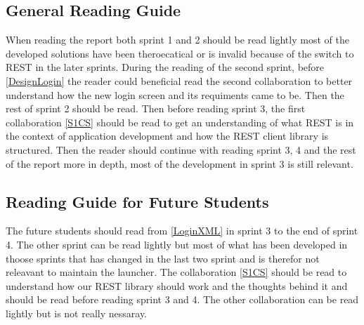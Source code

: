 \subsection{General Reading Guide}
When reading the report both sprint 1 and 2 should be read lightly most of the
developed solutions have been theroecatical or is invalid because of the
switch to REST in the later sprints. During the reading of the second sprint,
before \autoref{DesignLogin} the reader could beneficial read the second
collaboration to better understand how the new login screen and its requiments
came to be. Then the rest of sprint 2 should be read. Then before reading sprint
3, the first collaboration \autoref{S1CS} should be read to get an understanding
of what REST is in the context of application development and how the REST client library is structured. 
Then the reader should continue with reading sprint 3, 4 and the rest of the
report more in depth, most of the development in sprint 3 is still relevant.

\subsection{Reading Guide for Future Students}
The future students should read from \autoref{LoginXML} in sprint 3 to the end
of sprint 4. The other sprint can be read lightly but most of what has been
developed in thoose sprints that has changed in the last two sprint and is
therefor not releavant to maintain the launcher. The collaboration
\autoref{S1CS} should be read to understand how our REST library should work and
the thoughts behind it and should be read before reading sprint 3 and 4. The
other collaboration can be read lightly but is not really nessaray.


